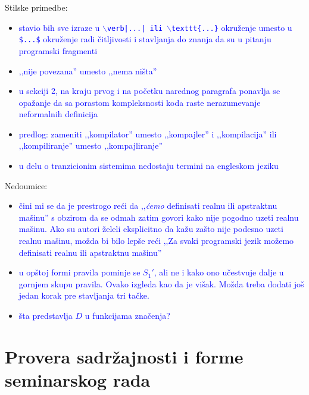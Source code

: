 \documentclass[a4paper]{report}
\newcommand{\odgovor}[1]{\textcolor{blue}{#1}}
\begin{document}
{Stilske primedbe:}
\begin{itemize}
	\item \odgovor{stavio bih sve izraze u {\tt $\backslash$verb|...| ili $\backslash$texttt\{...\}} okruženje umesto u {\tt \$...\$} okruženje radi čitljivosti i stavljanja do znanja da su u pitanju programski fragmenti}
	\item \odgovor{‚‚nije povezana'' umesto ‚‚nema ništa''}
	\item \odgovor{u sekciji 2, na kraju prvog i na početku narednog paragrafa ponavlja se opažanje da sa porastom kompleksnosti koda raste nerazumevanje neformalnih definicija}
	\item \odgovor{predlog: zameniti ‚‚kompilator'' umesto ‚‚kompajler'' i ‚‚kompilacija'' ili ‚‚kompiliranje'' umesto ,,kompajliranje''}
	\item \odgovor{u delu o tranzicionim sistemima nedostaju termini na engleskom jeziku}
\end{itemize}

{Nedoumice:}
\begin{itemize}
	\item \odgovor{čini mi se da je prestrogo reći da ‚‚\textit{ćemo} definisati realnu ili apstraktnu mašinu'' s obzirom da se odmah zatim govori kako nije pogodno uzeti realnu mašinu. Ako su autori želeli eksplicitno da kažu zašto nije podesno uzeti realnu mašinu, možda bi bilo lepše reći ‚‚Za svaki programski jezik možemo definisati realnu ili apstraktnu mašinu''}
	\item \odgovor{u opštoj formi pravila pominje se $S_1'$, ali ne i kako ono učestvuje dalje u gornjem skupu pravila. Ovako izgleda kao da je višak. Možda treba dodati još jedan korak pre stavljanja tri tačke.}
	\item \odgovor{šta predstavlja $D$ u funkcijama značenja?}
\end{itemize}

\section{Provera sadržajnosti i forme seminarskog rada}
\end{document}
